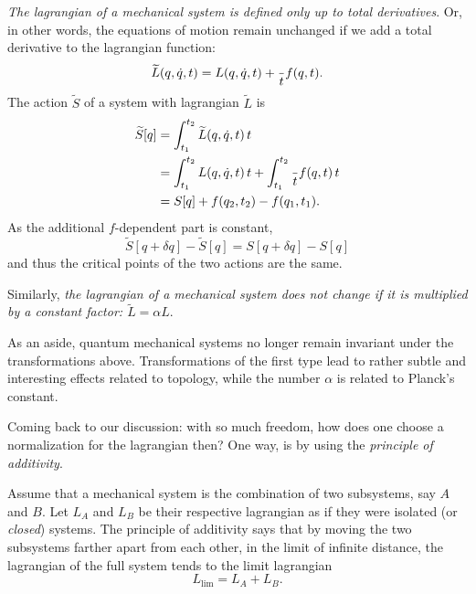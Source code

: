 \documentclass[english,fontsize=11pt,paper=a5,oneside]{scrbook}
\let\d\relax
\newcommand{\d}{\mathrm{d}}
\theoremstyle{definition}
\newenvironment{remark}
  {\pushQED{\qed}\renewcommand{\qedsymbol}{$\lozenge$}\remarkx}
  {\popQED\endremarkx}
\begin{document}
\begin{remark}\label{rmk:manylagrangians}
  \emph{The lagrangian of a mechanical system is defined only up to total derivatives}.
  Or, in other words, the equations of motion remain unchanged if we add a total derivative to the lagrangian function:
  \begin{equation}
    \widetilde L(q,\dot q, t) = L(q, \dot q, t) + \frac{\d}{\d t} f(q,t).
  \end{equation}
  The action $\widetilde S$ of a system with lagrangian $\widetilde L$ is
  \begin{align}
    \widetilde S[q] & = \int_{t_1}^{t_2} \widetilde L(q, \dot q, t) \,\d t                                       \\
                    & = \int_{t_1}^{t_2} L(q, \dot q, t) \,\d t + \int_{t_1}^{t_2} \frac{\d}{\d t} f(q,t) \,\d t \\
                    & = S[q] + f(q_2, t_2) - f(q_1, t_1).
  \end{align}
  As the additional $f$-dependent part is constant,
  \begin{equation}
    \widetilde S[q+\delta q] - \widetilde S[q]
    = S[q+\delta q] - S[q]
  \end{equation}
  and thus the critical points of the two actions are the same.

  Similarly, \emph{the lagrangian of a mechanical system does not change if it is multiplied by a constant factor: $\widetilde L = \alpha L$}.

  As an aside, quantum mechanical systems no longer remain invariant under the transformations above. Transformations of the first type lead to rather subtle and interesting effects related to topology, while the number $\alpha$ is related to Planck's constant.
\end{remark}

Coming back to our discussion: with so much freedom, how does one choose a normalization for the lagrangian then?
One way, is by using the \emph{principle of additivity}.
\begin{tcolorbox}
  Assume that a mechanical system is the combination of two subsystems, say $A$ and $B$.
  Let $L_A$ and $L_B$ be their respective lagrangian as if they were isolated (or \emph{closed}) systems.
  The principle of additivity says that by moving the two subsystems farther apart from each other, in the limit of infinite distance, the lagrangian of the full system tends to the limit lagrangian
  \begin{equation}
    L_{\lim} = L_A + L_B.
  \end{equation}
\end{tcolorbox}
\end{document}
